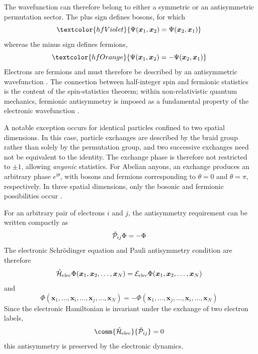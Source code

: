 \documentclass[11pt,a4paper,titlepage]{article}
\numberwithin{equation}{section}
\newcommand{\bx}{\boldsymbol{x}}
\newcommand{\chH}{\Hat{\mathcal{H}}}
\newcommand{\chP}{\Hat{\mathcal{P}}}
\newcommand{\cE}{\mathcal{E}}
\newcommand{\orange}[1]{\textcolor{hfOrange}{#1}}
\newcommand{\violet}[1]{\textcolor{hfViolet}{#1}}
\newcommand{\ii}{\mathrm{i}}
\begin{document}
The wavefunction can therefore belong to either a symmetric or an
antisymmetric permutation sector. The plus sign defines \violet{bosons},
for which
\begin{equation}
  \violet{
  \Psi(\bx_1,\bx_2)
  =
  \Psi(\bx_2,\bx_1)
  }
\end{equation}
whereas the minus sign defines \orange{fermions},
\begin{equation}
  \orange{
  \Psi(\bx_1,\bx_2)
  =
  -
  \Psi(\bx_2,\bx_1)
  }
\end{equation}
Electrons are fermions and must therefore be described by an antisymmetric
wavefunction \citep{Dirac1926}. The connection between half-integer spin and fermionic
statistics is the content of the spin-statistics theorem; within
non-relativistic quantum mechanics, fermionic antisymmetry is imposed as a
fundamental property of the electronic wavefunction \citep{Pauli1940}.

A notable exception occurs for identical particles confined to two spatial
dimensions. In this case, particle exchanges are described by the braid
group rather than solely by the permutation group, and two successive
exchanges need not be equivalent to the identity. The exchange phase is
therefore not restricted to $\pm1$, allowing \emph{anyonic} statistics.
For Abelian anyons, an exchange produces an arbitrary phase
$e^{\ii\theta}$, with bosons and fermions corresponding to
$\theta=0$ and $\theta=\pi$, respectively. In three spatial dimensions,
only the bosonic and fermionic possibilities occur
\citep{LeinaasMyrheim1977,Wilczek1982}.

For an arbitrary pair of electrons $i$ and $j$, the antisymmetry requirement
can be written compactly as
\begin{equation}
  \chP_{ij}\Phi=-\Phi
\end{equation}
The electronic Schr\"odinger equation and Pauli antisymmetry condition are
therefore
\begin{equation}
  \chH_\text{elec}\Phi(\bx_1,\bx_2,\ldots,\bx_N)
  =
  \cE_\text{elec}\Phi(\bx_1,\bx_2,\ldots,\bx_N)
\end{equation}
and
\begin{equation}
  \Phi(\bx_1,\ldots,\bx_i,\ldots,\bx_j,\ldots,\bx_N)
  =
  -
  \Phi(\bx_1,\ldots,\bx_j,\ldots,\bx_i,\ldots,\bx_N)
  \label{eq:pauli-antisymmetry}
\end{equation}
Since the electronic Hamiltonian is invariant under the exchange of two
electron labels,
\begin{equation}
  \comm{\chH_\text{elec}}{\chP_{ij}}=0
\end{equation}
this antisymmetry is preserved by the electronic dynamics.
\end{document}
